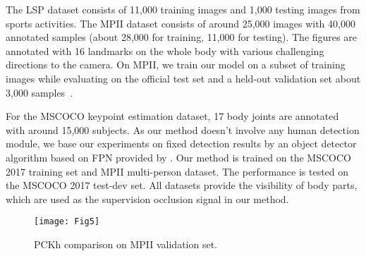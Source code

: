\documentclass[10pt,journal,compsoc]{IEEEtran}
\begin{document}
The LSP dataset consists of 11,000 training images and 1,000 testing images from sports activities.
The MPII dataset consists of around 25,000 images with 40,000 annotated samples (about 28,000 for training, 11,000 for testing).
The figures are annotated with 16 landmarks on the whole body with various challenging directions to the camera. On MPII, we train our model on a subset of training images while evaluating on the official test set and a held-out validation set about 3,000 samples~\cite{conf/cvpr/TompsonGJLB15,conf/eccv/NewellYD16}.

For the MSCOCO keypoint estimation dataset, 17 body joints are annotated with around 15,000 subjects.
As our method doesn't involve any human detection module, we base our experiments on fixed detection results by an object detector algorithm based on FPN \cite{lin2017feature} provided by \cite{chen2017cascaded}.
Our method is trained on the MSCOCO 2017 training set and MPII multi-person dataset.
The performance is tested on the MSCOCO 2017 test-dev set.
All datasets provide the visibility of body parts, which are used as the supervision occlusion signal in our method.


\begin{figure}[t!]
\centering
\texttt{[image: Fig5]}
\caption{PCKh comparison on MPII validation set.}
\label{fig:PCKh-comparison-on}
\end{figure}
\end{document}
